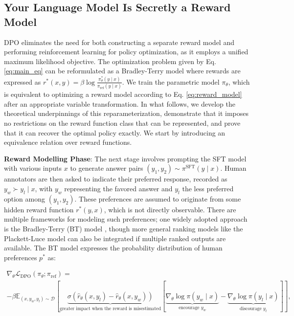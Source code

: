 \subsection{Your Language Model Is Secretly a Reward Model} DPO eliminates the need for both constructing a separate reward model and performing reinforcement learning for policy optimization, as it employs a unified maximum likelihood objective. The optimization problem given by Eq. \ref{eq:main_eq} can be reformulated as a Bradley-Terry model where rewards are expressed as $r^*(x, y) = \beta \log\frac{\pi^*_\theta(y \mid x)}{\pi_\text{ref}(y \mid x)}$. We train the parametric model $\pi_{\theta}$, which is equivalent to optimizing a reward model according to Eq. \ref{eq:reward_model} after an appropriate variable transformation. In what follows, we develop the theoretical underpinnings of this reparameterization, demonstrate that it imposes no restrictions on the reward function class that can be represented, and prove that it can recover the optimal policy exactly. We start by introducing an equivalence relation over reward functions.

\textbf{Reward Modelling Phase}: The next stage involves prompting the SFT model with various inputs $x$ to generate answer pairs $(y_1, y_2) \sim \pi^\text{SFT}(y \mid x)$. Human annotators are then asked to indicate their preferred response, recorded as $y_w \succ y_l \mid x$, with $y_w$ representing the favored answer and $y_l$ the less preferred option among $(y_1, y_2)$. These preferences are assumed to originate from some hidden reward function $r^*(y, x)$, which is not directly observable. There are multiple frameworks for modeling such preferences; one widely adopted approach is the Bradley-Terry (BT) model \cite{bradley1952rankanalysis}, though more general ranking models like the Plackett-Luce model \citep{plackett1975analysis, luce2012individual} can also be integrated if multiple ranked outputs are available. The BT model expresses the probability distribution of human preferences $p^*$ as:

\begin{multline*}\label{eq:gradient}
    \nabla_\theta \mathcal{L}_\text{DPO}(\pi_\theta;\pi_\text{ref}) = \\ -\beta\mathbb{E}_{(x, y_w, y_l) \sim \mathcal{D}} \left[\underbrace{\sigma(\hat{r}_\theta(x, y_l) - \hat{r}_\theta (x, y_w))}_{\text{greater impact when the reward is misestimated}}\left[\underbrace{\nabla_\theta\log \pi(y_w \mid x)}_{\text{encourage $y_w$}} - \underbrace{\nabla_\theta\log\pi(y_l \mid x)}_{\text{discourage $y_l$}}\right]\right],
\end{multline*}

